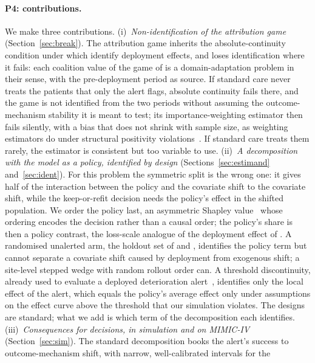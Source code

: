 \documentclass[letterpaper]{article} %
\begin{document}
\paragraph{P4: contributions.} We make three contributions.
(i)~\emph{Non-identification of the attribution game}
(Section~\ref{sec:break}). The attribution game inherits the
absolute-continuity condition under which \citet{boeken2024evaluating}
identify deployment effects, and loses identification where it fails: each
coalition value of the game of \citet{zhang2023attributing} is a
domain-adaptation problem in their sense, with the pre-deployment period as
source. If
standard care never treats the patients that only the alert flags, absolute
continuity fails there, and the game is not identified from the two periods
without assuming the outcome-mechanism stability it is meant to test; its
importance-weighting estimator then fails silently, with a bias that does not
shrink with sample size, as weighting estimators do under structural
positivity violations~\citep{petersen2012positivity}. If standard care treats
them rarely, the estimator is
consistent but too variable to use.
(ii)~\emph{A decomposition with the model as a policy, identified by design}
(Sections~\ref{sec:estimand} and~\ref{sec:ident}). For this problem the
symmetric split is the wrong one: it gives half of the interaction between the
policy and the covariate shift to the covariate shift, while the keep-or-refit
decision needs the policy's effect in the shifted population. We order the
policy last, an asymmetric Shapley value~\citep{frye2020asymmetric} whose
ordering encodes the decision rather than a causal order; the policy's share is
then a policy contrast, the loss-scale analogue of the deployment effect of
\citet{boeken2024evaluating}. A randomised unalerted arm, the holdout
set of \citet{liley2021model} and \citet{haidarwehbe2025holdout}, identifies
the policy term but cannot separate a covariate shift caused by deployment from
exogenous shift; a site-level stepped wedge with random rollout order can. A
threshold discontinuity, already used to evaluate a deployed deterioration
alert~\citep{gallo2024effectiveness}, identifies only the local effect of the
alert, which equals the policy's average effect only under assumptions on the
effect curve above the threshold that our simulation violates. The designs are
standard; what we add is which term of the decomposition each identifies.
(iii)~\emph{Consequences for decisions, in simulation and on MIMIC-IV}
(Section~\ref{sec:sim}). The standard decomposition books the alert's success
to outcome-mechanism shift, with narrow, well-calibrated intervals for the
\end{document}
